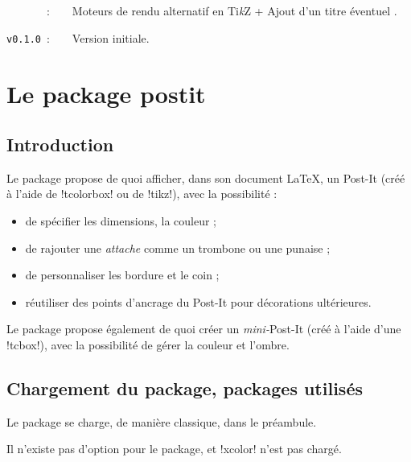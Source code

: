 \documentclass[french,a4paper,11pt]{article}
\providecommand\tikzlogo{Ti\textit{k}Z}
\let\TikZ\tikzlogo
\begin{document}
\verb|      |~:~~~~Moteurs de rendu alternatif en \TikZ{} + Ajout d'un titre éventuel .

\verb|v0.1.0|~:~~~~Version initiale.

\newpage

\section{Le package postit}

\subsection{Introduction}

\begin{noteblock}
Le package propose de quoi afficher, dans son document \LaTeX, un Post-It (créé à l'aide de \packagetex!tcolorbox! ou de \packagetex!tikz!), avec la possibilité :

\begin{itemize}
	\item de spécifier les dimensions, la couleur ;
	\item de rajouter une \textit{attache} comme un trombone ou une punaise ;
	\item de personnaliser les bordure et le coin ;
	\item réutiliser des points d'ancrage du Post-It pour décorations ultérieures.
\end{itemize}

Le package propose également de quoi créer un \textit{mini-}Post-It (créé à l'aide d'une \motcletex!tcbox!), avec la possibilité de gérer la couleur et l'ombre.
\end{noteblock}

\subsection{Chargement du package, packages utilisés}

\begin{importantblock}
Le package se charge, de manière classique, dans le préambule.

Il n'existe pas d'option pour le package, et \packagetex!xcolor! n'est pas chargé.
\end{importantblock}

\end{document}
